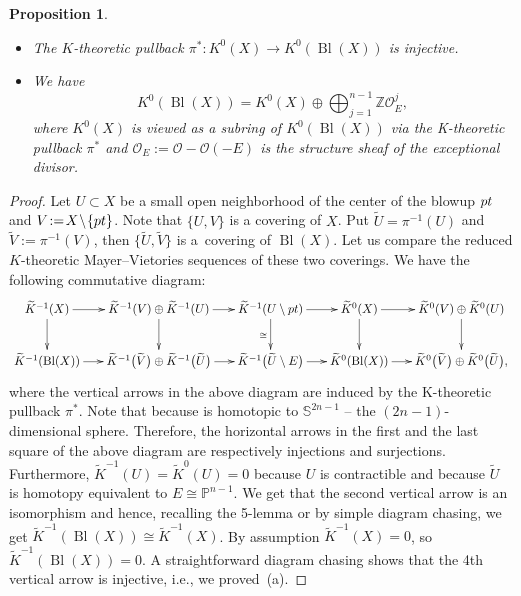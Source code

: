 \documentclass[10pt,a4paper]{article}
\numberwithin{equation}{section}
\newtheorem{Proposition}[Theorem]{Proposition}
\newcommand{\ZZ}{\mathbb{Z}}
\newcommand{\PP}{\mathbb{P}}
\renewcommand{\O}{\mathcal{O}}
\begin{document}
\begin{Proposition}\label{prop:K}\quad
\begin{itemize}
\item[$(a)$] The $K$-theoretic pullback $\pi^*\colon K^0(X)\to K^0(\operatorname{Bl}(X))$
 is injective.
\item[$(b)$] We have
 \[
 K^0(\operatorname{Bl}(X)) = K^0(X) \oplus \bigoplus_{j=1}^{n-1} \ZZ
 \O_E^j,
 \]
 where $K^0(X)$ is viewed as a subring of $K^0(\operatorname{Bl}(X)) $ via
 the K-theoretic pullback $\pi^*$ and $\O_E:=\O-\O(-E)$ is the
 structure sheaf of the exceptional divisor.
\end{itemize}
\end{Proposition}
\begin{proof}
Let $U\!\subset \!X$ be a small open neighborhood of the center of the
blowup ${\rm pt}$ and ${V\!:=\!X\!\setminus\!{\{{\rm pt}\}}}$. Note that
$\{U,V\}$ is a covering of $X$. Put $\widetilde{U}=\pi^{-1}(U)$ and
$\widetilde{V}:=\pi^{-1}(V)$, then $\big\{\widetilde{U},\widetilde{V}\big\}$
is a~covering of $\operatorname{Bl}(X)$. Let us compare the reduced $K$-theoretic
Mayer--Vietories sequences of these two coverings. We have the
following commutative diagram:
$$
\xymatrix@C=1.6em{
 \widetilde{K}^{-1}(X)\ar[r]\ar[d] &
 \widetilde{K}^{-1}(V)\oplus \widetilde{K}^{-1}(U) \ar[r]\ar[d] &
 \widetilde{K}^{-1}(U\setminus{{\rm pt}}) \ar[r]\ar[d]_{\cong}&
\widetilde{K}^{0}(X)\ar[r]\ar[d] &
 \widetilde{K}^0(V)\oplus \widetilde{K}^0(U) \ar[d]
\\
 \widetilde{K}^{-1}(\operatorname{Bl}(X))\ar[r] &
 \widetilde{ K}^{-1}\big(\widetilde{V}\big)\oplus\widetilde{ K}^{-1}\big(\widetilde{U}\big) \ar[r] &
\widetilde{ K}^{-1}\big(\widetilde{U}\setminus{E}\big) \ar[r]&
\widetilde{K}^{0}(\operatorname{Bl}(X))\ar[r] &
 \widetilde{ K}^0\big(\widetilde{V}\big)\oplus\widetilde{ K}^0\big(\widetilde{U}\big), }
$$
where the vertical
arrows in the above diagram are induced by the K-theoretic pullback
$\pi^*$. Note that
 because
 is
homotopic to $\mathbb{S}^{2n-1}$ -- the $(2n-1)$-dimensional sphere. Therefore, the horizontal arrows in the first and the last square of the above diagram are respectively injections and surjections.
Furthermore, $\widetilde{K}^{-1}(U)=\widetilde{K}^{0}(U)=0$ because $U$
is contractible and  because
$\widetilde{U}$ is homotopy equivalent to $E\cong \PP^{n-1}$. We get
that the second vertical arrow is an isomorphism  and hence, recalling the 5-lemma or by simple diagram chasing, we get
$\widetilde{K}^{-1}(\operatorname{Bl}(X)) \cong \widetilde{K}^{-1}(X)$. By assumption $\widetilde{K}^{-1}(X)=0$, so $\widetilde{K}^{-1}(\operatorname{Bl}(X)) =0$. A
straightforward diagram chasing shows that the 4th vertical arrow is
injective, i.e., we proved~(a).


\end{proof}
\end{document}

